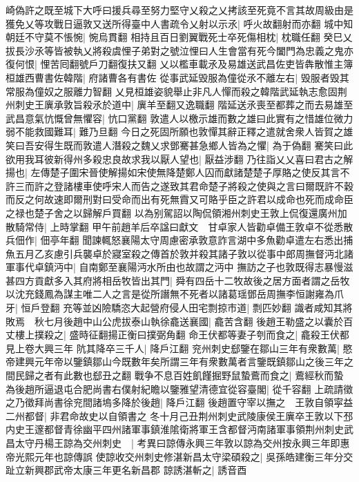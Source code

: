 崎偽許之既至城下大呼曰援兵尋至努力堅守乂殺之乂拷該至死竟不言其故周級由是獲免乂等攻戰日逼敦又送所得臺中人書疏令乂射以示氶|{
	呼火故翻射而亦翻}
城中知朝廷不守莫不悵惋|{
	惋烏貫翻}
相持且百日劉翼戰死士卒死傷相枕|{
	枕職任翻}
癸巳乂拔長沙氶等皆被執乂將殺虞悝子弟對之號泣悝曰人生會當有死今闔門為忠義之鬼亦復何恨|{
	悝苦囘翻號戶刀翻復扶又翻}
乂以檻車載氶及易雄送武昌佐吏皆犇散惟主簿桓雄西曹書佐韓階|{
	府諸曹各有書佐}
從事武延毁服為僮從氶不離左右|{
	毁服者毁其常服為僮奴之服離力智翻}
乂見桓雄姿貌舉止非凡人憚而殺之韓階武延執志愈固荆州刺史王廙承敦旨殺氶於道中|{
	廙羊至翻又逸職翻}
階延送氶喪至都葬之而去易雄至武昌意氣忼慨曾無懼容|{
	忼口黨翻}
敦遣人以檄示雄而數之雄曰此實有之惜雄位微力弱不能救國難耳|{
	難乃旦翻}
今日之死固所願也敦憚其辭正釋之遣就舍衆人皆賀之雄笑曰吾安得生既而敦遣人潛殺之魏乂求鄧騫甚急鄉人皆為之懼|{
	為于偽翻}
騫笑曰此欲用我耳彼新得州多殺忠良故求我以厭人望也|{
	厭益涉翻}
乃往詣乂乂喜曰君古之解揚也|{
	左傳楚子圍宋晉使解揚如宋使無降楚鄭人囚而獻諸楚楚子厚賂之使反其言不許三而許之登諸樓車使呼宋人而告之遂致其君命楚子將殺之使與之言曰爾既許不穀而反之何故速即爾刑對曰受命而出有死無霣又可賂乎臣之許君以成命也死而成命臣之禄也楚子舍之以歸解戶買翻}
以為别駕詔以陶侃領湘州刺史王敦上侃復還廣州加散騎常侍|{
	上時掌翻}
甲午前趙羊后卒諡曰獻文　甘卓家人皆勸卓備王敦卓不從悉散兵佃作|{
	佃亭年翻}
聞諫輒怒襄陽太守周慮密承敦意詐言湖中多魚勸卓遣左右悉出捕魚五月乙亥慮引兵襲卓於寢室殺之傳首於敦并殺其諸子敦以從事中郎周撫督沔北諸軍事代卓鎮沔中|{
	自南鄭至襄陽沔水所由也故謂之沔中}
撫訪之子也敦既得志暴慢滋甚四方貢獻多入其府將相岳牧皆出其門|{
	舜有四岳十二牧故後之居方面者謂之岳牧}
以沈充錢鳳為謀主唯二人之言是從所譖無不死者以諸葛瑶鄧岳周撫李恒謝雍為爪牙|{
	恒戶登翻}
充等並凶險驕恣大起營府侵人田宅剽掠市道|{
	剽匹妙翻}
識者咸知其將敗焉　秋七月後趙中山公虎拔泰山執徐龕送襄國|{
	龕苦含翻}
後趙王勒盛之以囊於百丈樓上撲殺之|{
	盛時征翻揚正衡曰撲弼角翻}
命王伏都等妻子刳而食之|{
	龕殺王伏都見上卷大興三年}
阬其降卒三千人|{
	降戶江翻}
兖州刺史郄鑒在鄒山三年有衆數萬|{
	愍帝建興元年帝以鑒鎮鄒山今既數年矣所謂三年有衆數萬者言鑒既鎮鄒山之後三年之間民歸之者有此數也郄丑之翻}
戰争不息百姓飢饉掘野鼠蟄鷰而食之|{
	鷰經秋而蟄}
為後趙所逼退屯合肥尚書右僕射紀瞻以鑒雅望清德宜從容臺閣|{
	從千容翻}
上疏請徵之乃徵拜尚書徐兖間諸塢多降於後趙|{
	降戶江翻}
後趙置守宰以撫之　王敦自領寜益二州都督|{
	非君命故史以自領書之}
冬十月己丑荆州刺史武陵康侯王廙卒王敦以下邳内史王邃都督青徐幽平四州諸軍事鎮淮隂衛將軍王含都督沔南諸軍事領荆州刺史武昌太守丹楊王諒為交州刺史　|{
	考異曰諒傳永興三年敦以諒為交州按永興三年即惠帝光熙元年也諒傳誤}
使諒收交州刺史修湛新昌太守梁碩殺之|{
	吳孫皓建衡三年分交趾立新興郡武帝太康三年更名新昌郡}
諒誘湛斬之|{
	誘音酉}
